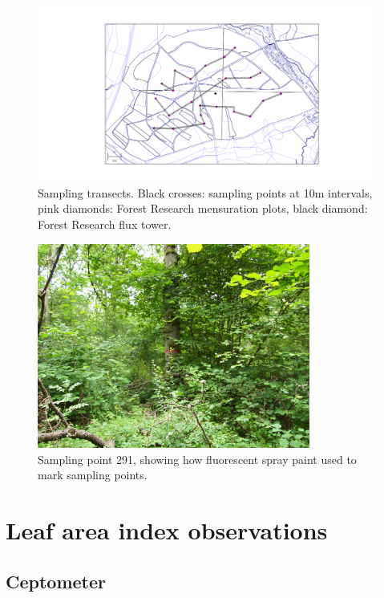 \documentclass[11pt]{article}
\begin{document}
\begin{figure}[ht]
    \centering
    \includegraphics[width=\textwidth]{straitsmap_threet_10m.png}
    \caption{Sampling transects. Black crosses: sampling points at 10m intervals, pink diamonds: Forest Research mensuration plots, black diamond: Forest Research flux tower.} \label{fig:transects}
\end{figure}

\begin{figure}[ht]
    \centering
    \includegraphics[width=0.8\textwidth]{291E.jpg}
    \caption{Sampling point 291, showing how fluorescent spray paint used to mark sampling points.} \label{fig:pink_tree}
\end{figure}

\section{Leaf area index observations}

\subsection{Ceptometer}
\end{document}
